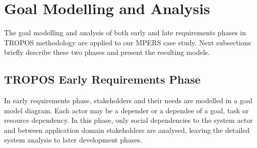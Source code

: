 





\section{Goal Modelling and Analysis}

The goal modelling and analysis of both early and late requirements phases in TROPOS methodology are applied to our MPERS case study. Next subsections briefly describe these two phases and present the resulting models.

\subsection{TROPOS Early Requirements Phase}

In early requirements phase, stakeholders and their needs are modelled in a goal model diagram. Each actor may be a depender or a dependee of a goal, task or resource dependency. In this phase, only social dependencies to the system actor and between application domain stakeholders are analysed, leaving the detailed system analysis to later development phases.

